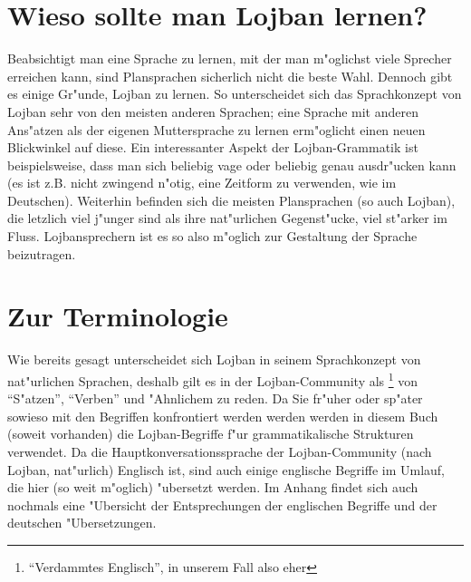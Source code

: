 \section{Wieso sollte man Lojban lernen?}
Beabsichtigt man eine Sprache zu lernen, mit der man m"oglichst viele Sprecher erreichen kann, sind Plansprachen sicherlich nicht die beste Wahl.
Dennoch gibt es einige Gr"unde, Lojban zu lernen. So unterscheidet sich das Sprachkonzept von Lojban sehr von den meisten anderen Sprachen;
eine Sprache mit anderen Ans"atzen als der eigenen Muttersprache zu lernen erm"oglicht einen neuen Blickwinkel auf diese. Ein interessanter Aspekt der Lojban-Grammatik ist beispielsweise, dass
man sich beliebig vage oder beliebig genau ausdr"ucken kann (es ist z.B. nicht zwingend n"otig, eine Zeitform zu verwenden, wie im Deutschen). Weiterhin befinden sich die meisten Plansprachen (so auch Lojban), die letzlich viel j"unger sind als ihre
nat"urlichen Gegenst"ucke, viel st"arker im Fluss. Lojbansprechern ist es so also m"oglich zur Gestaltung der Sprache beizutragen.


\section{Zur Terminologie}
Wie bereits gesagt unterscheidet sich Lojban in seinem Sprachkonzept von nat"urlichen Sprachen, deshalb gilt es in der Lojban-Community als \footnote{``Verdammtes Englisch'', in unserem Fall also eher }
von ``S"atzen'', ``Verben'' und "Ahnlichem zu reden. Da Sie fr"uher oder sp"ater sowieso mit den Begriffen konfrontiert werden werden
werden in diesem Buch (soweit vorhanden) die Lojban-Begriffe f"ur grammatikalische Strukturen verwendet. Da die Hauptkonversationssprache der Lojban-Community (nach Lojban, nat"urlich) Englisch ist, sind auch einige englische Begriffe im Umlauf, die hier (so weit m"oglich) "ubersetzt werden. Im Anhang findet sich auch nochmals eine "Ubersicht der Entsprechungen der englischen Begriffe und der deutschen "Ubersetzungen.


